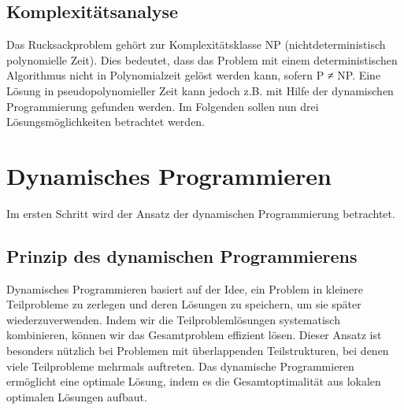 \documentclass[12pt]{report}
\begin{document}
\section{Komplexitätsanalyse}
Das Rucksackproblem gehört zur Komplexitätsklasse NP (nichtdeterministisch polynomielle Zeit). Dies bedeutet, dass das Problem mit einem deterministischen Algorithmus nicht in Polynomialzeit gelöst werden kann, sofern P ≠ NP. Eine Lösung in pseudopolynomieller Zeit kann jedoch z.B. mit Hilfe der dynamischen Programmierung gefunden werden. \cite{assi8672677}
Im Folgenden sollen nun drei Lösungsmöglichkeiten betrachtet werden.

\newpage
\chapter{Dynamisches Programmieren}
Im ersten Schritt wird der Ansatz der dynamischen Programmierung betrachtet.
\section{Prinzip des dynamischen Programmierens}
Dynamisches Programmieren basiert auf der Idee, ein Problem in kleinere Teilprobleme zu zerlegen und deren Lösungen zu speichern, um sie später wiederzuverwenden. Indem wir die Teilproblemlösungen systematisch kombinieren, können wir das Gesamtproblem effizient lösen. Dieser Ansatz ist besonders nützlich bei Problemen mit überlappenden Teilstrukturen, bei denen viele Teilprobleme mehrmals auftreten. Das dynamische Programmieren ermöglicht eine optimale Lösung, indem es die Gesamtoptimalität aus lokalen optimalen Lösungen aufbaut.\cite{cormen2022introduction}

\end{document}
